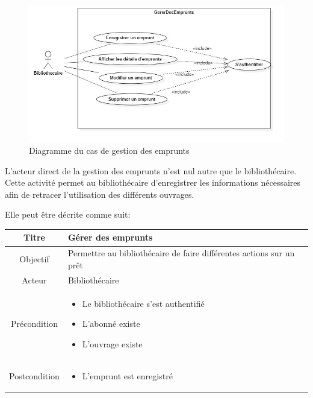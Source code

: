 \paragraph{}
\begin{figure}[h]
        \centering
        \includegraphics[width=1\textwidth]{gestionDesEmpruntsUseCase}
        \caption{Diagramme du cas de gestion des emprunts}
        \label{image-gestionDesEmpruntsUseCase}
        \end{figure}
\par
L'acteur direct de la gestion des emprunts n'est nul autre que le bibliothécaire. Cette activité 
permet au bibliothécaire d'enregistrer les informations nécessaires afin de retracer l'utilisation
des différents ouvrages.\par 
Elle peut être décrite comme suit: \par 
\begin{tabular}{|c|p{7cm}|}
        \hline
        Titre & Gérer des emprunts \\
        \hline
        Objectif & Permettre au bibliothécaire de faire différentes actions sur un prêt \\
        \hline
        Acteur & Bibliothécaire \\
        \hline
        Précondition & \begin{itemize}
                \item Le bibliothécaire s'est authentifié 
                \item L'abonné existe
                \item L'ouvrage existe
        \end{itemize} \\
        \hline
        Postcondition & \begin{itemize}
                \item L'emprunt est enregistré 
        \end{itemize} \\
        \hline
\end{tabular}
